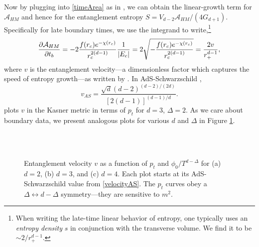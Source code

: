 \documentclass[12pt,a4paper]{article}
\begin{document}
Now by plugging into \eqref{timeArea} as in \cite{Hartman:2013qma}, we can obtain the linear-growth term for $\mathcal{A}_{HM}$ and hence for the entanglement entropy $S = V_{d-2}\mathcal{A}_{HM}/(4G_{d+1})$. Specifically for late boundary times, we use the integrand to write,\footnote{When writing the late-time linear behavior of entropy, one typically uses an \textit{entropy density} $s$ in conjunction with the transverse volume. We find it to be $\sim 2/r_+^{d-1}$.}
\begin{equation}
\pdv{\mathcal{A}_{HM}}{t_b} = -2 \frac{f(r_c)e^{-\chi(r_c)}}{r_c^{2(d-1)}} \frac{1}{|E_c|} = 2\sqrt{-\frac{f(r_c) e^{-\chi(r_c)}}{r_{c}^{2(d-1)}}} = \frac{2v}{r_{+}^{d-1}},\label{eVel}
\end{equation}
where $v$ is the entanglement velocity---a dimensionless factor which captures the speed of entropy growth---as written by \cite{Frenkel:2020ysx}. In AdS-Schwarzschild \cite{Hartman:2013qma},
\begin{equation}
v_{AS} = \frac{\sqrt{d}(d-2)^{(d-2)/(2d)}}{[2(d-1)]^{(d-1)/d}}.\label{velocityAS}
\end{equation}
\cite{Frenkel:2020ysx} plots $v$ in the Kasner metric in terms of $p_t$ for $d = 3$, $\Delta = 2$. As we care about boundary data, we present analogous plots for various $d$ and $\Delta$ in Figure \ref{figs:entanglementVelocity}.

{
\begin{figure}
\centering
{}\\\vspace{0.4cm}
\\\vspace{0.4cm}
\caption{Entanglement velocity $v$ as a function of $p_t$ and $\phi_0/T^{d-\Delta}$ for (a) $d = 2$, (b) $d = 3$, and (c) $d = 4$. Each plot starts at its AdS-Schwarzschild value from \eqref{velocityAS}. The $p_t$ curves obey a $\Delta \leftrightarrow d-\Delta$ symmetry---they are sensitive to $m^2$.}
\label{figs:entanglementVelocity}
\end{figure}
}
\end{document}
